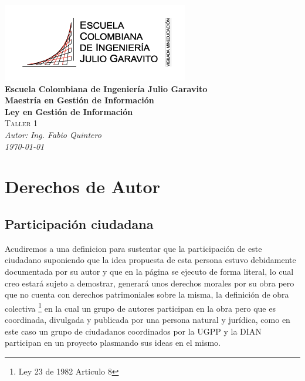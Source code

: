 \documentclass[
letterpaper,
12pt,
singlespacing,
headsepline]{article}
\begin{document}
	\begin{titlepage}
	   \begin{center}
			\includegraphics[scale=0.5]{Images/1110_logotipo_institucional_vm300px.png} \\
		    \Large{\textbf{Escuela Colombiana de Ingeniería Julio Garavito}\vspace{2cm}}\\
		    \textbf{Maestría en Gestión de Información}\vspace{1cm}\\
		    \textbf{Ley en Gestión de Información}\vspace{1cm}\\
			\textsc{Taller 1} \vspace{2cm}  \\   
			\emph{Autor:} \textit{Ing. Fabio Quintero}\vspace{5cm}\\
	     \textit{\today}\\

	   \end{center}
	\end{titlepage}
	






\section{Derechos de Autor}

\subsection{Participación ciudadana}
Acudiremos a una definicion para sustentar que la participación de este ciudadano suponiendo que la idea propuesta de esta persona estuvo debidamente documentada por su autor y que en la página se ejecuto de forma literal, lo cual creo estará sujeto a demostrar,  generará unos derechos morales por su obra pero que no cuenta con derechos patrimoniales sobre la misma, la definición de obra colectiva \footnote{Ley 23 de 1982 Articulo 8} en la cual un grupo de autores participan en la obra pero que es coordinada, divulgada y publicada por una persona natural y jurídica, como en este caso un grupo de ciudadanos coordinados por la UGPP y la DIAN participan en un proyecto plasmando sus ideas en el mismo. 
\end{document}
